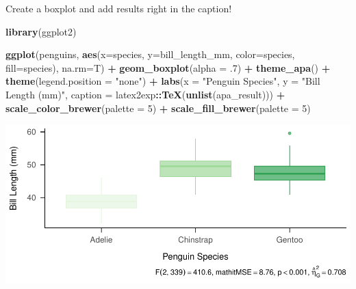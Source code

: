 \documentclass[
]{book}
\newenvironment{Shaded}{\begin{snugshade}}{\end{snugshade}}
\newcommand{\AttributeTok}[1]{\textcolor[rgb]{0.13,0.29,0.53}{#1}}
\newcommand{\DecValTok}[1]{\textcolor[rgb]{0.00,0.00,0.81}{#1}}
\newcommand{\FunctionTok}[1]{\textcolor[rgb]{0.13,0.29,0.53}{\textbf{#1}}}
\newcommand{\NormalTok}[1]{#1}
\newcommand{\SpecialCharTok}[1]{\textcolor[rgb]{0.81,0.36,0.00}{\textbf{#1}}}
\newcommand{\StringTok}[1]{\textcolor[rgb]{0.31,0.60,0.02}{#1}}
\begin{document}
Create a boxplot and add results right in the caption!

\begin{Shaded}
\begin{Highlighting}[]
\FunctionTok{library}\NormalTok{(ggplot2)}

\FunctionTok{ggplot}\NormalTok{(penguins, }\FunctionTok{aes}\NormalTok{(}\AttributeTok{x=}\NormalTok{species, }\AttributeTok{y=}\NormalTok{bill\_length\_mm, }\AttributeTok{color=}\NormalTok{species, }\AttributeTok{fill=}\NormalTok{species), }\AttributeTok{na.rm=}\NormalTok{T) }\SpecialCharTok{+}
  \FunctionTok{geom\_boxplot}\NormalTok{(}\AttributeTok{alpha =}\NormalTok{ .}\DecValTok{7}\NormalTok{) }\SpecialCharTok{+} \FunctionTok{theme\_apa}\NormalTok{() }\SpecialCharTok{+} \FunctionTok{theme}\NormalTok{(}\AttributeTok{legend.position =} \StringTok{"none"}\NormalTok{) }\SpecialCharTok{+}
  \FunctionTok{labs}\NormalTok{(}\AttributeTok{x =} \StringTok{"Penguin Species"}\NormalTok{, }\AttributeTok{y =} \StringTok{"Bill Length (mm)"}\NormalTok{, }
       \AttributeTok{caption =}\NormalTok{ latex2exp}\SpecialCharTok{::}\FunctionTok{TeX}\NormalTok{(}\FunctionTok{unlist}\NormalTok{(apa\_result))) }\SpecialCharTok{+}
  \FunctionTok{scale\_color\_brewer}\NormalTok{(}\AttributeTok{palette =} \DecValTok{5}\NormalTok{) }\SpecialCharTok{+}
  \FunctionTok{scale\_fill\_brewer}\NormalTok{(}\AttributeTok{palette =} \DecValTok{5}\NormalTok{)}
\end{Highlighting}
\end{Shaded}

\includegraphics{_main_files/figure-html/anal-viz-1.pdf}
\end{document}
